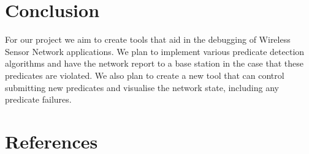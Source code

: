 \documentclass[a4paper]{article}
\begin{document}
\section{Conclusion}

For our project we aim to create tools that aid in the debugging of Wireless Sensor Network applications. We plan to implement various predicate detection algorithms and have the network report to a base station in the case that these predicates are violated. We also plan to create a new tool that can control submitting new predicates and visualise the network state, including any predicate failures.

\clearpage

\appendixpage
\addappheadtotoc
\appendix


\section{References}
\renewcommand{\refname}{\vspace{-1cm}}


\end{document}
